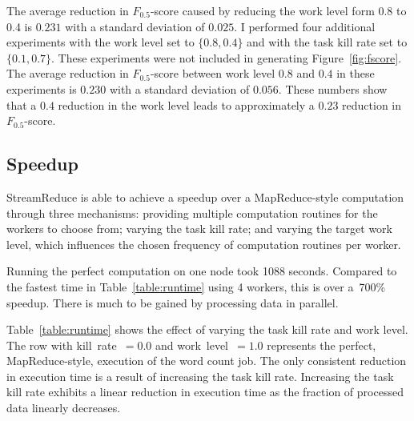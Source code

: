 \documentclass[12pt,twocolumn]{article}
\begin{document}
The average reduction in $F_{0.5}$-score caused by reducing the work level form 0.8 to 0.4
is
$0.231$ with a standard deviation of $0.025$. I performed four additional experiments with
the
work level set to $\{0.8,0.4\}$ and with the task kill rate set to $\{0.1,0.7\}$. These
experiments were
not included in generating Figure~\ref{fig:fscore}. The average reduction in $F_{0.5}$-score
between
work level $0.8$ and $0.4$ in these experiments is $0.230$ with a standard deviation of
$0.056$. These numbers show that a $0.4$ reduction in the work level leads to
approximately a
$0.23$ reduction in $F_{0.5}$-score.

\subsection{Speedup}
StreamReduce is able to achieve a speedup over a MapReduce-style computation through
three mechanisms:
providing multiple computation routines for the workers to choose from; varying the task kill
rate; and varying the target work level, which influences the chosen frequency of
computation
routines per worker.

Running the perfect computation on one node took 1088 seconds. Compared to the fastest time
in Table~\ref{table:runtime} using 4 workers, this is over a~700\% speedup. There is much to
be gained by processing data in parallel.

Table~\ref{table:runtime} shows the effect of varying the task kill rate and work level. The
row
with kill~rate~$=0.0$ and work~level~$=1.0$ represents the perfect, MapReduce-style,
execution
of the word count job. The only consistent reduction in execution time is a result of
increasing the task kill rate. Increasing the task kill rate exhibits a linear reduction in
execution
time as the fraction of processed data linearly decreases.
\end{document}
